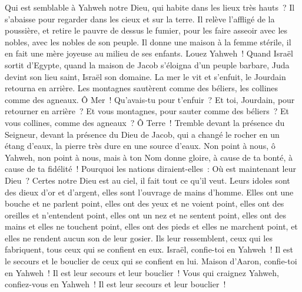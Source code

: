 \begin{multicols}{2}
Qui est semblable à Yahweh notre Dieu, qui habite dans les lieux très hauts~?
Il s'abaisse pour regarder dans les cieux et sur la terre.
Il relève l'affligé de la poussière, et retire le pauvre de dessus le fumier,
pour les faire asseoir avec les nobles, avec les nobles de son peuple.
Il donne une maison à la femme stérile, il en fait une mère joyeuse au milieu de ses enfants. Louez Yahweh~!
\VerseOne{}Quand Israël sortit d'Egypte, quand la maison de Jacob s'éloigna d'un peuple barbare,
Juda devint son lieu saint, Israël son domaine.
La mer le vit et s'enfuit, le Jourdain retourna en arrière.
Les montagnes sautèrent comme des béliers, les collines comme des agneaux.
Ô Mer~! Qu'avais-tu pour t'enfuir~? Et toi, Jourdain, pour retourner en arrière~?
Et vous montagnes, pour sauter comme des béliers~? Et vous collines, comme des agneaux~?
Ô Terre~! Tremble devant la présence du Seigneur, devant la présence du Dieu de Jacob,
qui a changé le rocher en un étang d'eaux, la pierre très dure en une source d'eaux.
\VerseOne{}Non point à nous, ô Yahweh, non point à nous, mais à ton Nom donne gloire, à cause de ta bonté, à cause de ta fidélité~!
Pourquoi les nations diraient-elles~: Où est maintenant leur Dieu~?
Certes notre Dieu est au ciel, il fait tout ce qu'il veut.
Leurs idoles sont des dieux d'or et d'argent, elles sont l'ouvrage de mains d'homme.
Elles ont une bouche et ne parlent point, elles ont des yeux et ne voient point,
elles ont des oreilles et n'entendent point, elles ont un nez et ne sentent point,
elles ont des mains et elles ne touchent point, elles ont des pieds et elles ne marchent point, et elles ne rendent aucun son de leur gosier.
Ils leur ressemblent, ceux qui les fabriquent, tous ceux qui se confient en eux.
Israël, confie-toi en Yahweh~! Il est le secours et le bouclier de ceux qui se confient en lui.
Maison d'Aaron, confie-toi en Yahweh~! Il est leur secours et leur bouclier~!
Vous qui craignez Yahweh, confiez-vous en Yahweh~! Il est leur secours et leur bouclier~!

\end{multicols}
